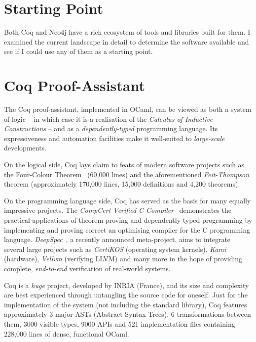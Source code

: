 \section{Starting Point}

Both Coq and Neo4j have a rich ecosystem of tools and libraries built for them.
I examined the current landscape in detail to determine the software available
and see if I could use any of them as a starting point.

\section{Coq Proof-Assistant}

The Coq proof-assistant, implemented in OCaml, can be viewed as both a system of
logic -- in which case it is a realisation of the \emph{Calculus of Inductive
Constructions} -- and as a \emph{dependently-typed} programming language. Its
expressiveness and automation facilities make it well-suited to
\emph{large-scale} developments.

On the logical side, Coq lays claim to feats of modern software projects such
as the Four-Colour Theorem~{\citep{gonthier2008formal}} (60,000 lines) and the
aforementioned \emph{Feit-Thompson} theorem (approximately 170,000 lines, 15,000
definitions and 4,200 theorems).

On the programming language side, Coq has served as the basis for many equally
impressive projects. The \emph{CompCert Verified C
Compiler}~{\citep{leroy2012compcert}} demonstrates the practical applications of
theorem-proving and dependently-typed programming by implementing and proving
correct an optimising compiler for the C programming language.
\emph{DeepSpec}~{\citep{pierce2016science}}, a recently announced meta-project,
aims to integrate several large projects such as \emph{CertiKOS} (operating
system kernels), \emph{Kami} (hardware), \emph{Vellvm} (verifying LLVM) and many
more in the hope of providing complete, \emph{end-to-end} verification of
real-world systems.

Coq is a \emph{huge} project, developed by INRIA (France), and its size and
complexity are best experienced through untangling the source code for oneself.
Just for the implementation of the system (not including the standard library),
Coq features approximately 3 major ASTs (Abstract Syntax Trees), 6
transformations between them, 3000 visible types, 9000 APIs and 521
implementation files containing 228,000 lines of dense, functional OCaml.

